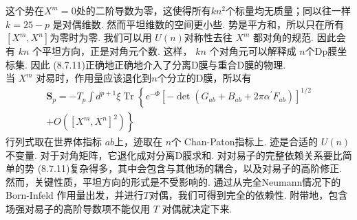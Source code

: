 这个势在$X^{m}=0$处的二阶导数为零，这使得所有$k n^{2}$个标量均无质量；同以往一样 $k=25-p$ 是对偶维数. 然而平坦维数的空间更小些. 势是平方和，所以只在所有 $\left[X^{m}, X^{n}\right]$为零时为零. 我们可以用 $U(n)$对称性去往 $X^{m}$ 都对角的规范. 因此会有 $k n$ 个平坦方向，正是对角元个数. 
这样， $k n$ 个对角元可以解释成 $n $个Dp膜坐标集. 因此 (8.7.11)正确地正确地介入了分离D膜与重合D膜的物理.\\
当 $X^{m}$ 对易时，作用量应该退化到$n$个分立的D膜，所以有
\begin{equation}
	\begin{gathered}
		\boldsymbol{S}_{p}=-T_{p} \int d^{p+1} \xi \operatorname{Tr}\left\{e^{-\Phi}\left[-\operatorname{det}\left(G_{a b}+B_{a b}+2 \pi \alpha^{\prime} F_{a b}\right)\right]^{1 / 2}\right. \\
		\left.+O\left(\left[X^{m}, X^{n}\right]^{2}\right)\right\}
	\end{gathered}
\end{equation}
行列式取在世界体指标 $a b$上，迹取在 $n$个 Chan-Paton指标上. 迹是合适的 $U(n)$ 不变量. 对于对角矩阵，它退化成对分离D膜求和. 对对易子的完整依赖关系要比简单的势 (8.7.11)复杂得多，其中会包含与其他场的耦合，以及对易子的高阶修正. 然而，关键性质，平坦方向的形式是不受影响的. 通过从完全Neumann情况下的 Born-Infeld 作用量出发，并进行$T$对偶，我们可得到完全的依赖性. 附带地，包含场强对易子的高阶导数项不能仅用 $T$ 对偶就决定下来.


